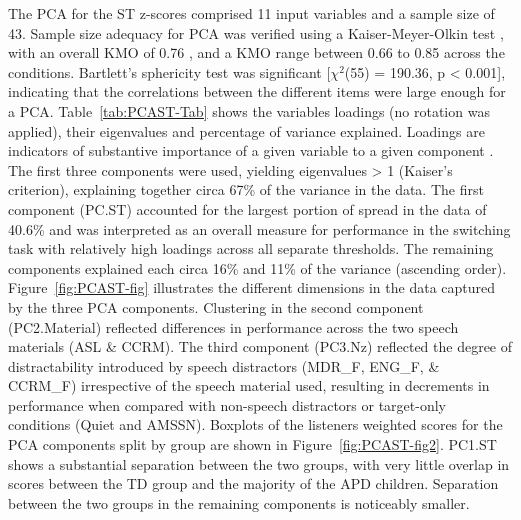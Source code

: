 \documentclass[a4paper, twoside]{templates/ociamthesis}
\begin{document}
The PCA for the ST z-scores comprised 11 input variables and a sample size of 43. Sample size adequacy for PCA was verified using a Kaiser-Meyer-Olkin test \autocite[psych::KMO;][]{psychPackageR}, with an overall KMO of 0.76 \autocite[`good';][]{Field2012Chpt17}, and a KMO range between 0.66 to 0.85 across the conditions. Bartlett's sphericity test was significant {[}\(\chi^2\)(55) = 190.36, p \textless{} 0.001{]}, indicating that the correlations between the different items were large enough for a PCA. Table~\ref{tab:PCAST-Tab} shows the variables loadings (no rotation was applied), their eigenvalues and percentage of variance explained. Loadings are indicators of substantive importance of a given variable to a given component \autocite{Field2012Chpt17}. The first three components were used, yielding eigenvalues \textgreater{} 1 (Kaiser's criterion), explaining together circa 67\% of the variance in the data. The first component (PC.ST) accounted for the largest portion of spread in the data of 40.6\% and was interpreted as an overall measure for performance in the switching task with relatively high loadings across all separate thresholds. The remaining components explained each circa 16\% and 11\% of the variance (ascending order). Figure~\ref{fig:PCAST-fig} illustrates the different dimensions in the data captured by the three PCA components. Clustering in the second component (PC2.Material) reflected differences in performance across the two speech materials (ASL \& CCRM). The third component (PC3.Nz) reflected the degree of distractability introduced by speech distractors (MDR\_F, ENG\_F, \& CCRM\_F) irrespective of the speech material used, resulting in decrements in performance when compared with non-speech distractors or target-only conditions (Quiet and AMSSN). Boxplots of the listeners weighted scores for the PCA components split by group are shown in Figure~\ref{fig:PCAST-fig2}. PC1.ST shows a substantial separation between the two groups, with very little overlap in scores between the TD group and the majority of the APD children. Separation between the two groups in the remaining components is noticeably smaller.\\
\end{document}
